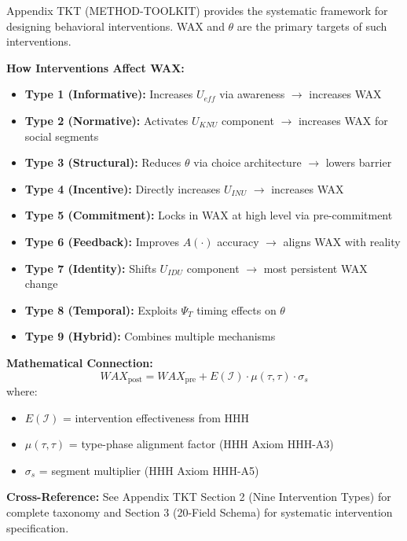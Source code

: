 \begin{tcolorbox}[colback=orange!5!white, colframe=orange!75!black,
    title=\textbf{HHH Integration: Intervention Design Toolkit}]

Appendix TKT (METHOD-TOOLKIT) provides the systematic framework for designing
behavioral interventions. WAX and $\theta$ are the primary targets of such interventions.

\textbf{How Interventions Affect WAX:}
\begin{itemize}[nosep]
    \item \textbf{Type 1 (Informative):} Increases $U_{eff}$ via awareness $\to$ increases WAX
    \item \textbf{Type 2 (Normative):} Activates $U_{KNU}$ component $\to$ increases WAX for social segments
    \item \textbf{Type 3 (Structural):} Reduces $\theta$ via choice architecture $\to$ lowers barrier
    \item \textbf{Type 4 (Incentive):} Directly increases $U_{INU}$ $\to$ increases WAX
    \item \textbf{Type 5 (Commitment):} Locks in WAX at high level via pre-commitment
    \item \textbf{Type 6 (Feedback):} Improves $A(\cdot)$ accuracy $\to$ aligns WAX with reality
    \item \textbf{Type 7 (Identity):} Shifts $U_{IDU}$ component $\to$ most persistent WAX change
    \item \textbf{Type 8 (Temporal):} Exploits $\Psi_T$ timing effects on $\theta$
    \item \textbf{Type 9 (Hybrid):} Combines multiple mechanisms
\end{itemize}

\textbf{Mathematical Connection:}
\begin{equation}
WAX_{\text{post}} = WAX_{\text{pre}} + E(\mathcal{I}) \cdot \mu(\tau, \tau) \cdot \sigma_s
\label{eq:av-hhh-wax-change}
\end{equation}
where:
\begin{itemize}[nosep]
    \item $E(\mathcal{I})$ = intervention effectiveness from HHH
    \item $\mu(\tau, \tau)$ = type-phase alignment factor (HHH Axiom HHH-A3)
    \item $\sigma_s$ = segment multiplier (HHH Axiom HHH-A5)
\end{itemize}

\textbf{Cross-Reference:} See Appendix TKT Section 2 (Nine Intervention Types) for complete taxonomy
and Section 3 (20-Field Schema) for systematic intervention specification.

\end{tcolorbox}

